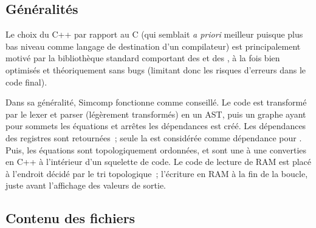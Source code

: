 \documentclass[11pt,a4paper]{article}
\begin{document}
\subsection{Généralités}

Le choix du C++ par rapport au C (qui semblait \textit{a priori} meilleur puisque plus bas niveau comme langage de destination d'un compilateur) est principalement motivé par la bibliothèque standard comportant des  et des , à la fois bien optimisés et théoriquement sans bugs (limitant donc les risques d'erreurs dans le code final).

Dans sa généralité, Simcomp fonctionne comme conseillé. Le code est transformé par le lexer et parser (légèrement transformés) en un AST, puis un graphe ayant pour sommets les équations et arrêtes les dépendances est créé. Les dépendances des registres sont retournées~; seule la  est considérée comme dépendance pour . Puis, les équations sont topologiquement ordonnées, et sont une à une converties en C++ à l'intérieur d'un squelette de code. Le code de lecture de RAM est placé à l'endroit décidé par le tri topologique~; l'écriture en RAM à la fin de la boucle, juste avant l'affichage des valeurs de sortie.

\subsection{Contenu des fichiers}
\end{document}

